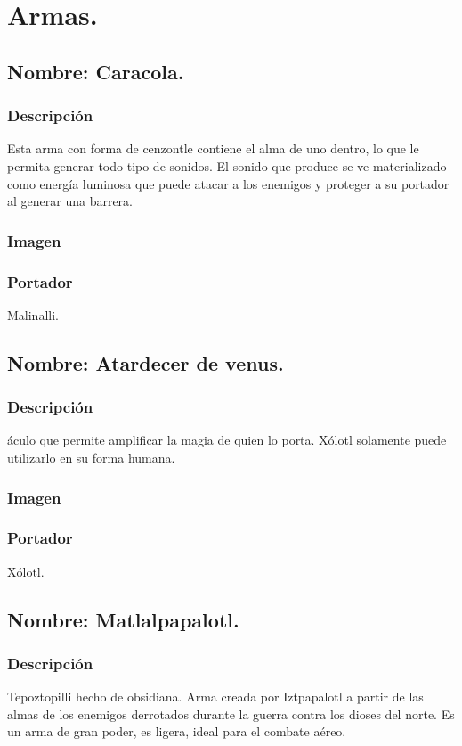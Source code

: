 \documentclass[11pt,letterpaper]{article}
\begin{document}
\section{Armas.}
\subsection{Nombre: Caracola.}
\subsubsection{Descripción}
Esta arma con forma de cenzontle contiene el alma de uno dentro, lo que le permita generar todo tipo de sonidos. El sonido que produce se ve materializado como energía luminosa que puede atacar a los enemigos y proteger a su portador al generar una barrera.
\subsubsection{Imagen}
\subsubsection{Portador}
Malinalli.

\subsection{Nombre: Atardecer de venus.}
\subsubsection{Descripción}
áculo que permite amplificar la magia de quien lo porta. Xólotl solamente puede utilizarlo en su forma humana.
\subsubsection{Imagen}
\subsubsection{Portador}
Xólotl.

\subsection{Nombre: Matlalpapalotl.}
\subsubsection{Descripción}
Tepoztopilli hecho de obsidiana. Arma creada por Iztpapalotl a partir de las almas de los enemigos derrotados durante la guerra contra los dioses del norte. Es un arma de gran poder, es ligera, ideal para el combate aéreo.
\end{document}
